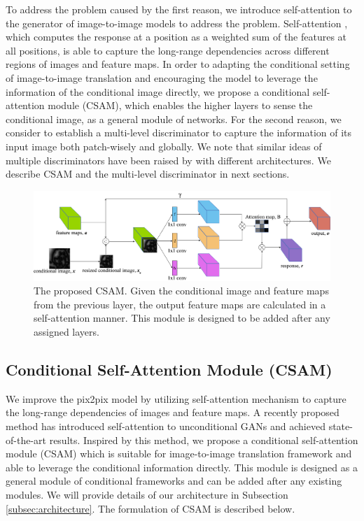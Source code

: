 To address the problem caused by the first reason, we introduce self-attention to the generator of image-to-image models to address the problem.
Self-attention \cite{Non-local, Attention, MachineReading, SAGANs}, which computes the response at a position as a weighted sum of the features at all positions, is able to capture the long-range dependencies across different regions of images and feature maps. In order to adapting the conditional setting of image-to-image translation and encouraging the model to leverage the information of the conditional image directly, we propose a conditional self-attention module (CSAM), which enables the higher layers to sense the conditional image, as a general module of networks.
%
For the second reason, we consider to establish a multi-level discriminator to capture the information of its input image both patch-wisely and globally. We note that similar ideas of multiple discriminators have been raised by \cite{LaplaceGANs, SGANs, StackGANs, CRN} with different architectures. We describe CSAM and the multi-level discriminator in next sections.
%
%
\begin{figure}
	\includegraphics[width=\textwidth]{figures/CSAM}
	\caption{The proposed CSAM. Given the conditional image and feature maps from the previous layer, the output feature maps are calculated in a self-attention manner. This module is designed to be added after any assigned layers.}
	\label{fig:CSAM}
\end{figure}
%
%
\subsection{Conditional Self-Attention Module (CSAM)}
\label{subsec:CSAM}
We improve the pix2pix model by utilizing self-attention mechanism to capture the long-range dependencies of images and feature maps. A recently proposed method \cite{SAGANs} has introduced self-attention to unconditional GANs and achieved state-of-the-art results. Inspired by this method, we propose a conditional self-attention module (CSAM) which is suitable for image-to-image translation framework and able to leverage the conditional information directly. This module is designed as a general module of conditional frameworks and can be added after any existing modules. We will provide details of our architecture in Subsection \ref{subsec:architecture}. The formulation of CSAM is described below.

